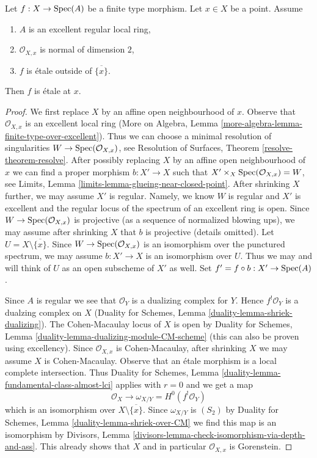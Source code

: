 \begin{lemma}
\label{lemma-key-purity-ramification}
Let $f : X \to \mathop{\mathrm{Spec}}(A)$ be a finite type morphism.
Let $x \in X$ be a point. Assume
\begin{enumerate}
\item $A$ is an excellent regular local ring,
\item $\mathcal{O}_{X, x}$ is normal of dimension $2$,
\item $f$ is \'etale outside of $\overline{\{x\}}$.
\end{enumerate}
Then $f$ is \'etale at $x$.
\end{lemma}

\begin{proof}
We first replace $X$ by an affine open neighbourhood of $x$.
Observe that $\mathcal{O}_{X, x}$ is an excellent local ring
(More on Algebra, Lemma \ref{more-algebra-lemma-finite-type-over-excellent}).
Thus we can choose a minimal resolution of singularities
$W \to \mathop{\mathrm{Spec}}(\mathcal{O}_{X, x})$, see
Resolution of Surfaces, Theorem \ref{resolve-theorem-resolve}.
After possibly replacing $X$ by an affine open neighbourhood of $x$
we can find a proper morphism $b : X' \to X$ such that
$X' \times_X \mathop{\mathrm{Spec}}(\mathcal{O}_{X, x}) = W$, see
Limits, Lemma \ref{limits-lemma-glueing-near-closed-point}.
After shrinking $X$ further, we may assume $X'$ is regular.
Namely, we know $W$ is regular and $X'$ is excellent
and the regular locus of the spectrum of an excellent ring is open.
Since $W \to \mathop{\mathrm{Spec}}(\mathcal{O}_{X, x})$ is projective
(as a sequence of normalized blowing ups), we may assume
after shrinking $X$ that $b$ is projective (details omitted).
Let $U = X \setminus \overline{\{x\}}$.
Since $W \to \mathop{\mathrm{Spec}}(\mathcal{O}_{X, x})$ is an isomorphism over the
punctured spectrum, we may assume $b : X' \to X$ is an isomorphism over $U$.
Thus we may and will think of $U$ as an open subscheme of $X'$ as well.
Set $f' = f \circ b : X' \to \mathop{\mathrm{Spec}}(A)$.

\medskip\noindent
Since $A$ is regular we see that $\mathcal{O}_Y$ is a dualizing complex for $Y$.
Hence $f^!\mathcal{O}_Y$ is a dualzing complex on $X$
(Duality for Schemes, Lemma \ref{duality-lemma-shriek-dualizing}).
The Cohen-Macaulay locus of $X$ is open by
Duality for Schemes, Lemma \ref{duality-lemma-dualizing-module-CM-scheme}
(this can also be proven using excellency).
Since $\mathcal{O}_{X, x}$ is Cohen-Macaulay, after shrinking
$X$ we may assume $X$ is Cohen-Macaulay.
Observe that an \'etale morphism is a local complete intersection.
Thus
Duality for Schemes, Lemma \ref{duality-lemma-fundamental-class-almost-lci}
applies with $r = 0$ and we get a map
$$
\mathcal{O}_X \longrightarrow \omega_{X/Y} = H^0(f^!\mathcal{O}_Y)
$$
which is an isomorphism over $X \setminus \overline{\{x\}}$.
Since $\omega_{X/Y}$ is $(S_2)$ by
Duality for Schemes, Lemma \ref{duality-lemma-shriek-over-CM}
we find this map is an isomorphism by
Divisors, Lemma \ref{divisors-lemma-check-isomorphism-via-depth-and-ass}.
This already shows that $X$ and in particular $\mathcal{O}_{X, x}$ is
Gorenstein.


\end{proof}
